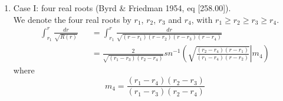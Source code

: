 \documentclass[12pt]{book}
\begin{document}
\begin{enumerate}
 \item Case I: four real roots (Byrd \& Friedman 1954, eq [258.00]).\\
We denote the four real roots by $r_1$, $r_2$, $r_3$ and $r_4$, with $r_1\geq r_2\geq r_3 \geq r_4$.
\begin{eqnarray}
\int_{r_1}^{r}\frac{dr}{\sqrt{R(r)}}&&=\int_{r_1}^{r}\frac{dr}{\sqrt{(r-r_1)(r-r_2)(r-r_3)(r-r_4)}}\\
&&=\frac{2}{\sqrt{(r_1-r_3)(r_2-r_4)}}sn^{-1}\left(\left.\sqrt{\frac{(r_2-r_4)(r-r_1)}{(r_1-r_4)(r-r_2)}}\right|m_4\right)
\end{eqnarray}
where
\begin{equation}
 m_4=\frac{(r_1-r_4)(r_2-r_3)}{(r_1-r_3)(r_2-r_4)}
\end{equation}


\end{enumerate}
\end{document}

